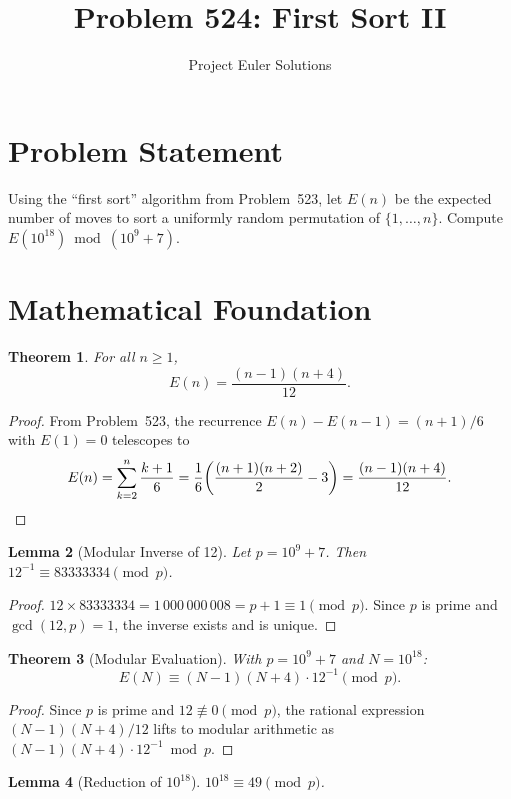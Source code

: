 \documentclass[11pt]{article}
\title{Problem 524: First Sort II}
\author{Project Euler Solutions}
\date{}
\newtheorem{theorem}{Theorem}
\newtheorem{lemma}[theorem]{Lemma}
\begin{document}
\maketitle

\section{Problem Statement}
Using the ``first sort'' algorithm from Problem~523, let $E(n)$ be the expected number of moves to sort a uniformly random permutation of $\{1, \ldots, n\}$. Compute $E(10^{18}) \bmod (10^9 + 7)$.

\section{Mathematical Foundation}

\begin{theorem}
For all $n \ge 1$,
\[
E(n) = \frac{(n-1)(n+4)}{12}.
\]
\end{theorem}

\begin{proof}
From Problem~523, the recurrence $E(n) - E(n-1) = (n+1)/6$ with $E(1) = 0$ telescopes to
\[
E(n) = \sum_{k=2}^{n}\frac{k+1}{6} = \frac{1}{6}\!\left(\frac{(n+1)(n+2)}{2}-3\right) = \frac{(n-1)(n+4)}{12}. \qedhere
\]
\end{proof}

\begin{lemma}[Modular Inverse of 12]
Let $p = 10^9+7$. Then $12^{-1} \equiv 83333334 \pmod{p}$.
\end{lemma}

\begin{proof}
$12 \times 83333334 = 1\,000\,000\,008 = p + 1 \equiv 1 \pmod{p}$. Since $p$ is prime and $\gcd(12,p)=1$, the inverse exists and is unique.
\end{proof}

\begin{theorem}[Modular Evaluation]
With $p = 10^9+7$ and $N = 10^{18}$:
\[
E(N) \equiv (N-1)(N+4) \cdot 12^{-1} \pmod{p}.
\]
\end{theorem}

\begin{proof}
Since $p$ is prime and $12 \not\equiv 0\pmod{p}$, the rational expression $(N-1)(N+4)/12$ lifts to modular arithmetic as $(N-1)(N+4)\cdot 12^{-1}\bmod p$.
\end{proof}

\begin{lemma}[Reduction of $10^{18}$]
$10^{18} \equiv 49 \pmod{p}$.
\end{lemma}
\end{document}
